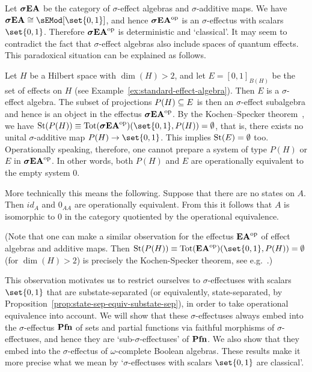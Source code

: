 \documentclass[%
	submission,
copyright,creativecommons,UKenglish]{eptcs}
\begin{document}
\begin{example}
Let $\boldsymbol{\sigma}\mathbf{EA}$ be the category of $\sigma$-effect algebras
and $\sigma$-additive maps.
We have $\sEA\cong \sEMod[\set{0,1}]$,
and hence $\boldsymbol{\sigma}\mathbf{EA}^{\mathrm{op}}$ is an $\sigma$-effectus
with scalars $\set{0,1}$.
Therefore $\boldsymbol{\sigma}\mathbf{EA}^{\mathrm{op}}$ is deterministic
and `classical'.
It may seem to contradict the fact that
$\sigma$-effect algebras also include spaces of quantum effects.
This paradoxical situation can be explained as follows.

  Let $H$ be a Hilbert space with $\dim(H)>2$,
  and let $E=[0,1]_{B(H)}$ be the set of effects on $H$
  (see Example~\ref{ex:standard-effect-algebra}).
  Then $E$ is a $\sigma$-effect algebra.
  The subset of projections
  $P(H)\subseteq E$ is then an $\sigma$-effect subalgebra
  and hence is an object in the
  effectus $\boldsymbol{\sigma}\mathbf{EA}^{\mathrm{op}}$.
  By the Kochen--Specker theorem~\cite{KochenS1967}, we have
  $\St(P(H))\equiv \Tot(\sEA^\opp)(\set{0,1},P(H)) = \emptyset$,
  that is, there exists
  no unital $\sigma$-additive map $P(H)\to\set{0,1}$.
  This implies $\mathrm{St}(E)=\emptyset$ too.
  Operationally speaking,
  therefore,
  one cannot prepare a system of
  type $P(H)$ or $E$ in $\boldsymbol{\sigma}\mathbf{EA}^{\mathrm{op}}$.
  In other words, both $P(H)$ and $E$
  are operationally equivalent to the empty system $0$.
  \begin{Auxproof}
  More technically this means the following.
  Suppose that there are no states on $A$.
  Then $id_A$ and $0_{AA}$ are operationally equivalent.
  From this it follows that
  $A$ is isomorphic to $0$ in the category
  quotiented by the operational equivalence.

  (Note that one can make a similar observation
  for the effectus $\mathbf{EA}^{\mathrm{op}}$ of effect algebras and additive maps.
  Then $\St(P(H))\equiv
  \Tot(\EA^{\opp})(\set{0,1},P(H)) = \emptyset$
  (for $\dim(H)>2$)
  is precisely the Kochen-Specker theorem,
  see e.g.~\cite{StatonU2018}.)
  \end{Auxproof}
\end{example}

This observation motivates us to restrict ourselves to
$\sigma$-effectuses with scalars $\set{0,1}$
that are substate-separated (or equivalently,
state-separated,
by Proposition~\ref{prop:state-sep-equiv-substate-sep}),
in order to take
operational equivalence into account.
We will show that these $\sigma$-effectuses
always embed into
the $\sigma$-effectus $\mathbf{Pfn}$ of sets and partial functions
via faithful morphisms of $\sigma$-effectuses,
and hence they are `sub-$\sigma$-effectuses' of $\mathbf{Pfn}$.
We also show that they embed into
the $\sigma$-effectus of $\omega$-complete Boolean algebras.
These results make it more precise what we mean by
`$\sigma$-effectuses with scalars $\set{0,1}$ are classical'.
\end{document}
